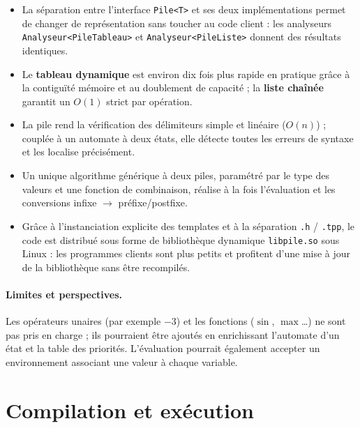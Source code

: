 \documentclass[11pt,a4paper]{article}
\newcommand{\code}[1]{\texttt{#1}}
\begin{document}
\begin{itemize}
  \item La séparation entre l'interface \code{Pile<T>} et ses deux
        implémentations permet de changer de représentation sans toucher au
        code client : les analyseurs \code{Analyseur<PileTableau>} et
        \code{Analyseur<PileListe>} donnent des résultats identiques.
  \item Le \textbf{tableau dynamique} est environ dix fois plus rapide en
        pratique grâce à la contiguïté mémoire et au doublement de capacité ;
        la \textbf{liste chaînée} garantit un $O(1)$ strict par opération.
  \item La pile rend la vérification des délimiteurs simple et linéaire
        ($O(n)$) ; couplée à un automate à deux états, elle détecte toutes
        les erreurs de syntaxe et les localise précisément.
  \item Un unique algorithme générique à deux piles, paramétré par le type
        des valeurs et une fonction de combinaison, réalise à la fois
        l'évaluation et les conversions infixe $\to$ préfixe/postfixe.
  \item Grâce à l'instanciation explicite des templates et à la séparation
        \code{.h} / \code{.tpp}, le code est distribué sous forme de
        bibliothèque dynamique \code{libpile.so} sous Linux : les programmes
        clients sont plus petits et profitent d'une mise à jour de la
        bibliothèque sans être recompilés.
\end{itemize}

\paragraph{Limites et perspectives.} Les opérateurs unaires (par exemple
$-3$) et les fonctions ($\sin$, $\max$\dots) ne sont pas pris en charge ; ils
pourraient être ajoutés en enrichissant l'automate d'un état et la table des
priorités. L'évaluation pourrait également accepter un environnement
associant une valeur à chaque variable.

\appendix
\section{Compilation et exécution}
\end{document}
